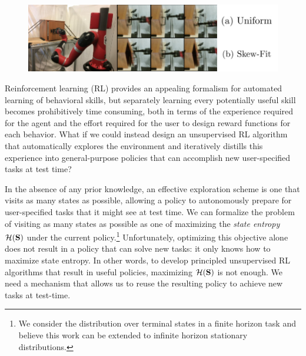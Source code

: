 \setlength{\intextsep}{-.9pt}
\begin{figure}
  \includegraphics[width=\linewidth]{skewfit/figures/realworldwithsamples.png}
  \label{fig:offline-sk-real}
\end{figure}
Reinforcement learning (RL) provides an appealing formalism for automated learning of behavioral skills, but separately learning every potentially useful skill becomes prohibitively time consuming, both in terms of the experience required for the agent and the effort required for the user to design reward functions for each behavior.
What if we could instead design an unsupervised RL algorithm that automatically explores the environment and iteratively distills this experience into general-purpose policies that can accomplish new user-specified tasks at test time?

In the absence of any prior knowledge, an effective exploration scheme is one that visits as many states as possible, allowing a policy to autonomously prepare for user-specified tasks that it might see at test time.
We can formalize the problem of visiting as many states as possible as one of maximizing the \emph{state entropy} ${\mathcal{H}}({\mathbf{S}})$ under the current policy.\footnote{We consider the distribution over terminal states in a finite horizon task  and believe this work can be extended to infinite horizon stationary distributions.}
Unfortunately, optimizing this objective alone does not result in a policy that can solve new tasks: it only knows how to maximize state entropy.
In other words, to develop principled unsupervised RL algorithms that result in useful policies, maximizing ${\mathcal{H}}({\mathbf{S}})$ is not enough.
We need a mechanism that allows us to reuse the resulting policy to achieve new tasks at test-time.

